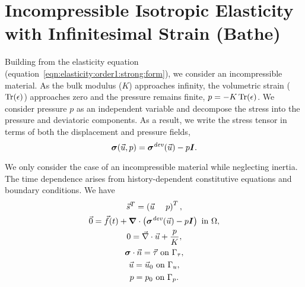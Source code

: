 \section{Incompressible Isotropic Elasticity with Infinitesimal Strain (Bathe)}

Building from the elasticity equation
(equation~\ref{eqn:elasticity:order1:strong:form}), we consider an
incompressible material. As the bulk modulus ($K$) approaches
infinity, the volumetric strain ($\operatorname{Tr}(\epsilon)$) approaches zero and
the pressure remains finite, $p = -K \operatorname{Tr}(\epsilon)$. We consider
pressure $p$ as an independent variable and decompose the stress into the
pressure and deviatoric components. As a result, we write the stress tensor in terms of both the displacement and pressure fields,
\begin{equation}
  \bm{\sigma}(\vec{u},p) = \bm{\sigma}^\mathit{dev}(\vec{u}) - p\bm{I}.
\end{equation}

We only consider the case of an incompressible material while
neglecting inertia. The time dependence arises from
history-dependent constitutive equations and boundary conditions. We
have
\begin{gather}
  \vec{s}^T = \left( \vec{u} \quad \ p \right)^T, \\
  \vec{0} = \vec{f}(t) + \bm{\nabla} \cdot \left(\bm{\sigma}^\mathit{dev}(\vec{u}) - p\bm{I}\right) \text{ in }\Omega, \\
  0 = \vec{\nabla} \cdot \vec{u} + \frac{p}{K}, \\
  \bm{\sigma} \cdot \vec{n} = \vec{\tau} \text{ on }\Gamma_\tau, \\
  \vec{u} = \vec{u}_0 \text{ on }\Gamma_u, \\
  p = p_0 \text{ on }\Gamma_p.
\end{gather}

